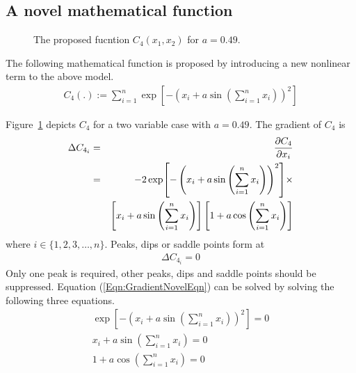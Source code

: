 \documentclass[twocolumn]{svjour3}          %
\begin{document}
\subsection{A novel mathematical function}
\begin{figure}
	\centering
	\label{Fig:TwoVarNovelFunc}
	\caption{The proposed fucntion $C_4(x_1, x_2)$ for $a = 0.49$.}
\end{figure}
The following mathematical function is proposed by introducing a new nonlinear term to the above model.
\begin{eqnarray}
	C_4(.) := \sum_{i=1}^{n}{\exp[-\left(x_i + a\sin\left(\sum_{i=1}^{n} x_i\right)\right)^2]} \label{Eqn:Novelmodel}
\end{eqnarray}
\par
Figure~\ref{Fig:TwoVarNovelFunc} depicts $C_4$ for a two variable case with $a=0.49$. The gradient of $C_4$ is
\begin{eqnarray}
	\Delta C_{4_i} &=& \pdv{C_4}{x_i} \nonumber\\
	&=& -2\exp[-\left(x_i + a\sin\left(\sum_{i=1}^{n} x_i\right)\right)^2] \times \nonumber\\
	&& \left[ x_i + a\sin\left(\sum_{i=1}^{n} x_i\right) \right] \left[1 + a\cos\left(\sum_{i=1}^{n} x_i\right) \right] \label{Eqn:GradientNovelFunc}
\end{eqnarray}
where $i \in \{1, 2, 3, \dots, n\}$. Peaks, dips or saddle points form at 
\begin{eqnarray}
	\Delta C_{4_i}=0 \label{Eqn:GradientNovelEqn}
\end{eqnarray}
Only one peak is required, other peaks, dips and saddle points should be suppressed. Equation (\ref{Eqn:GradientNovelEqn}) can be solved by solving the following three equations.
\begin{eqnarray}
	\exp[-\left(x_i + a\sin\left(\sum_{i=1}^{n} x_i\right)\right)^2]=0 \label{Eqn:GradientNovelEqn1} \\
	x_i + a\sin\left(\sum_{i=1}^{n} x_i\right)=0 \label{Eqn:GradientNovelSol2} \\
	1 + a\cos\left(\sum_{i=1}^{n} x_i\right)=0 \label{Eqn:GradientNovelEqn3}
\end{eqnarray}
\end{document}
